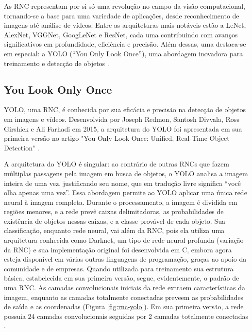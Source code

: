 As RNC representam por si só uma revolução no campo da visão computacional, tornando-se a base para uma variedade de aplicações, desde reconhecimento de imagens até análise de vídeos. Entre as arquiteturas mais notáveis estão a LeNet, AlexNet, VGGNet, GoogLeNet e ResNet, cada uma contribuindo com avanços significativos em profundidade, eficiência e precisão. Além dessas, uma destaca-se em especial: a YOLO (“You Only Look Once”), uma abordagem inovadora para treinamento e detecção de objetos \cite{carboni2021sistema}.

\subsection{You Look Only Once}
\label{sec:yolo}

YOLO, uma RNC, é conhecida por sua eficácia e precisão na detecção de objetos em imagens e vídeos. Desenvolvida por Joseph Redmon, Santosh Divvala, Ross Girshick e Ali Farhadi em 2015, a arquitetura do YOLO foi apresentada em sua primeira versão no artigo "You Only Look Once: Unified, Real-Time Object Detection" \cite{redmon2016youlookonce}.

A arquitetura do YOLO é singular: ao contrário de outras RNCs que fazem múltiplas passagens pela imagem em busca de objetos, o YOLO analisa a imagem inteira de uma vez, justificando seu nome, que em tradução livre significa “você olha apenas uma vez”. Essa abordagem permite ao YOLO aplicar uma única rede neural à imagem completa. Durante o processamento, a imagem é dividida em regiões menores, e a rede prevê caixas delimitadoras, as probabilidades de existência de objetos nessas caixas, e a classe provável de cada objeto. Sua classificação, enquanto rede neural, vai além da RNC, pois ela utiliza uma arquitetura conhecida como Darknet, um tipo de rede neural profunda (variação da RNC) e sua implementação original foi desenvolvida em C, embora agora esteja disponível em várias outras linguagens de programação, graças ao apoio da comunidade e de empresas. Quando utilizada para treinamento sua estrutura básica, estabelecida em sua primeira versão, segue, evidentemente, o padrão de uma RNC. As camadas convolucionais iniciais da rede extraem características da imagem, enquanto as camadas totalmente conectadas preveem as probabilidades de saída e as coordenadas (Figura \ref{fig:rnc-yolo}). Em sua primeira versão, a rede possuia 24 camadas convolucionais seguidas por 2 camadas totalmente conectadas \cite{yoloVisaoComputacional}.

